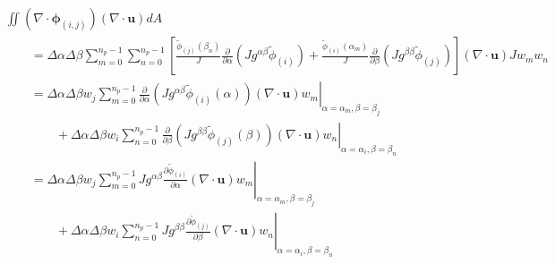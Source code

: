 \documentclass{article}
\newcommand{\vb}{\mathbf}
\newcommand{\vg}{\boldsymbol}
\newcommand{\pdiff}[2]{\frac{\partial #1}{\partial #2}}
\begin{document}
\begin{align}
& \iint (\nabla \cdot \vg{\phi}_{(i,j)}) (\nabla \cdot \vb{u}) dA \nonumber \\
& \qquad = \Delta \alpha \Delta \beta \sum_{m=0}^{n_p-1} \sum_{n=0}^{n_p-1} \left[ \frac{\tilde{\phi}_{(j)}(\beta_n)}{J} \pdiff{}{\alpha} \left( J g^{\alpha \beta} \tilde{\phi}_{(i)} \right) + \frac{\tilde{\phi}_{(i)}(\alpha_m)}{J} \pdiff{}{\beta} \left( J g^{\beta \beta} \tilde{\phi}_{(j)} \right) \right] (\nabla \cdot \vb{u}) J w_m w_n \\
& \qquad = \Delta \alpha \Delta \beta w_j \sum_{m=0}^{n_p-1} \left. \pdiff{}{\alpha} \left( J g^{\alpha \beta} \tilde{\phi}_{(i)}(\alpha) \right) (\nabla \cdot \vb{u}) w_m \right\vert_{\alpha = \alpha_m, \beta = \beta_j} \nonumber \\
& \qquad \qquad + \Delta \alpha \Delta \beta w_i \sum_{n=0}^{n_p-1} \left. \pdiff{}{\beta} \left( J g^{\beta \beta} \tilde{\phi}_{(j)}(\beta) \right) (\nabla \cdot \vb{u}) w_n \right\vert_{\alpha = \alpha_i, \beta = \beta_n} \\
& \qquad = \Delta \alpha \Delta \beta w_j \sum_{m=0}^{n_p-1} \left. J g^{\alpha \beta} \pdiff{\tilde{\phi}_{(i)}}{\alpha} (\nabla \cdot \vb{u}) w_m \right\vert_{\alpha = \alpha_m, \beta = \beta_j} \nonumber \\
& \qquad \qquad + \Delta \alpha \Delta \beta w_i \sum_{n=0}^{n_p-1} \left. J g^{\beta \beta} \pdiff{\tilde{\phi}_{(j)}}{\beta} (\nabla \cdot \vb{u}) w_n \right\vert_{\alpha = \alpha_i, \beta = \beta_n} \label{eq:VecHyperviscosityZeroAlphaDiv}
\end{align}
\end{document}
